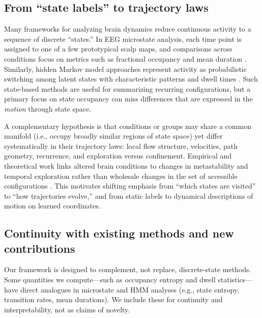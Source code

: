 \documentclass[5p,twocolumn,authoryear]{elsarticle}
\begin{document}
\subsection{From ``state labels'' to trajectory laws}

Many frameworks for analyzing brain dynamics reduce continuous activity to a sequence of discrete ``states.'' In EEG microstate analysis, each time point is assigned to one of a few prototypical scalp maps, and comparisons across conditions focus on metrics such as fractional occupancy and mean duration \citep{Michel2018}. Similarly, hidden Markov model approaches represent activity as probabilistic switching among latent states with characteristic patterns and dwell times \citep{Baker2014,Vidaurre2018}. Such state-based methods are useful for summarizing recurring configurations, but a primary focus on state occupancy can miss differences that are expressed in the \emph{motion} through state space.

A complementary hypothesis is that conditions or groups may share a common manifold (i.e., occupy broadly similar regions of state space) yet differ systematically in their trajectory laws: local flow structure, velocities, path geometry, recurrence, and exploration versus confinement. Empirical and theoretical work links altered brain conditions to changes in metastability and temporal exploration rather than wholesale changes in the set of accessible configurations \citep{Cavanna2018,Deco2017}. This motivates shifting emphasis from ``which states are visited'' to ``how trajectories evolve,'' and from static labels to dynamical descriptions of motion on learned coordinates.

\subsection{Continuity with existing methods and new contributions}

Our framework is designed to complement, not replace, discrete-state methods. Some quantities we compute---such as occupancy entropy and dwell statistics---have direct analogues in microstate and HMM analyses (e.g., state entropy, transition rates, mean durations). We include these for continuity and interpretability, not as claims of novelty.
\end{document}
